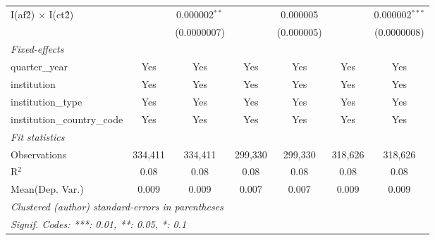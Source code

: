 \begin{tabular}{lcccccc}
   I(af\^2) $\times$ I(ct\^2)         &               & 0.000002$^{**}$  &                & 0.000005        &               & 0.000002$^{***}$\\   
                                      &               & (0.0000007)      &                & (0.000005)      &               & (0.0000008)\\   
   \midrule
   \emph{Fixed-effects}\\
   quarter\_year                      & Yes           & Yes              & Yes            & Yes             & Yes           & Yes\\  
   institution                        & Yes           & Yes              & Yes            & Yes             & Yes           & Yes\\  
   institution\_type                  & Yes           & Yes              & Yes            & Yes             & Yes           & Yes\\  
   institution\_country\_code         & Yes           & Yes              & Yes            & Yes             & Yes           & Yes\\  
   \midrule
   \emph{Fit statistics}\\
   Observations                       & 334,411       & 334,411          & 299,330        & 299,330         & 318,626       & 318,626\\  
   R$^2$                              & 0.08          & 0.08             & 0.08           & 0.08            & 0.08          & 0.08\\  
Mean(Dep. Var.) & 0.009 & 0.009 & 0.007 & 0.007 & 0.009 & 0.009 \\
   \midrule \midrule
   \multicolumn{7}{l}{\emph{Clustered (author) standard-errors in parentheses}}\\
   \multicolumn{7}{l}{\emph{Signif. Codes: ***: 0.01, **: 0.05, *: 0.1}}\\
\end{tabular}
\par\endgroup
